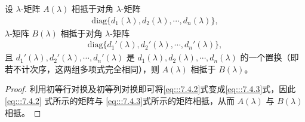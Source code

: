 \documentclass[../../main.tex]{subfiles}
\begin{document}
\begin{lemma}\label{lemma:对角元素的置换不改变相抵性}
设 $\lambda$-矩阵 $A(\lambda)$ 相抵于对角 $\lambda$-矩阵
\begin{align}
\mathrm{diag}\{d_1(\lambda),d_2(\lambda),\cdots,d_n(\lambda)\},
\label{eq:::7.4.2}
\end{align}
$\lambda$-矩阵 $B(\lambda)$ 相抵于对角 $\lambda$-矩阵
\begin{align}
\mathrm{diag}\{d_1'(\lambda),d_2'(\lambda),\cdots,d_n'(\lambda)\},
\label{eq:::7.4.3}
\end{align}
且 $d_1'(\lambda),d_2'(\lambda),\cdots,d_n'(\lambda)$ 是 $d_1(\lambda),d_2(\lambda),\cdots,d_n(\lambda)$ 的一个置换（即若不计次序，这两组多项式完全相同），则 $A(\lambda)$ 相抵于 $B(\lambda)$。
\end{lemma}
\begin{proof}
利用初等行对换及初等列对换即可将\eqref{eq:::7.4.2}式变成\eqref{eq:::7.4.3}式，因此\eqref{eq:::7.4.2} 式所示的矩阵与 \eqref{eq:::7.4.3}式所示的矩阵相抵，从而 $A(\lambda)$ 与 $B(\lambda)$ 相抵。
\end{proof}
\end{document}
